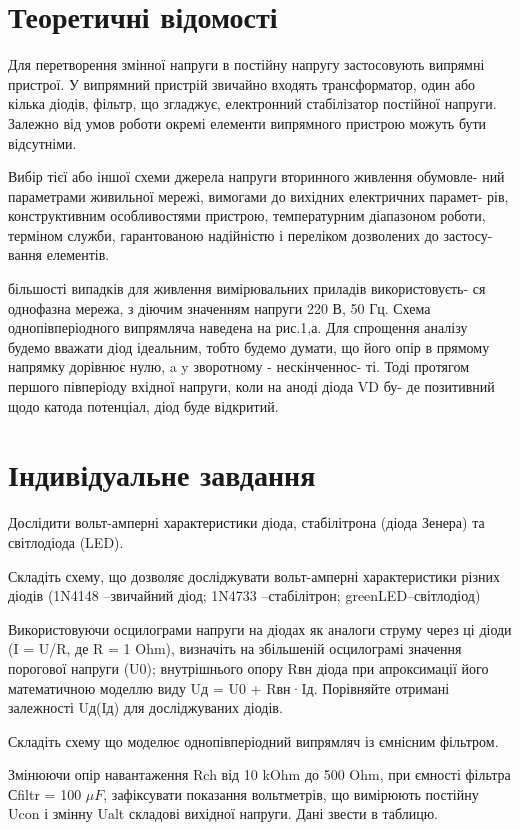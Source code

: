 \documentclass{article}
\begin{document}
\begin{normalsize}
	\section*{Теоретичні відомості}
	
	Для перетворення змінної напруги в постійну напругу застосовують випрямні
	пристрої. У випрямний пристрій звичайно входять трансформатор, один або
	кілька діодів, фільтр, що згладжує, електронний стабілізатор постійної напруги.
	Залежно від умов роботи окремі елементи випрямного пристрою можуть бути
	відсутніми.
	
	Вибір тієї або іншої схеми джерела напруги вторинного живлення обумовле-
	ний параметрами живильної мережі, вимогами до вихідних електричних парамет-
	рів, конструктивним особливостями пристрою, температурним діапазоном роботи,
	терміном служби, гарантованою надійністю і переліком дозволених до застосу-
	вання елементів.
	
	більшості випадків для живлення вимірювальних приладів використовуєть-
	ся однофазна мережа, з діючим значенням напруги 220 В, 50 Гц.
	Схема однопівперіодного випрямляча наведена на рис.1,а.
	Для спрощення аналізу будемо вважати діод ідеальним, тобто будемо думати,
	що його опір в прямому напрямку дорівнює нулю, a y зворотному - нескінченнос-
	ті. Тоді протягом першого півперіоду вхідної напруги, коли на аноді діода VD бу-
	де позитивний щодо катода потенціал, діод буде відкритий.
	
		\section*{Індивідуальне завдання}
	Дослідити вольт-амперні характеристики діода, стабілітрона (діода Зенера) та світлодіода (LED).
	
	Складіть схему, що дозволяє досліджувати вольт-амперні характеристики різних діодів (1N4148 –звичайний діод; 1N4733 –стабілітрон; greenLED–світлодіод)
	
	Використовуючи осцилограми напруги на діодах як аналоги струму через ці діоди (I = U/R, де R = 1 Ohm), визначіть на збільшеній осцилограмі значення порогової напруги (U0); внутрішнього опору Rвн діода при апроксимації його математичною моделлю виду Uд = U0 + Rвн·Iд. Порівняйте отримані залежності Uд(Iд) для досліджуваних діодів.
	
	Складіть схему що моделює однопівперіодний випрямляч із ємнісним фільтром.
	
	Змінюючи опір навантаження Rch від 10 kOhm до 500 Ohm, при ємності фільтра 
 Сfiltr =  100  $\mu F$,  зафіксувати  показання  вольтметрів,  що  вимірюють постійну Ucon і змінну Ualt складові вихідної напруги. Дані звести в таблицю.
 

\end{normalsize}
\end{document}
